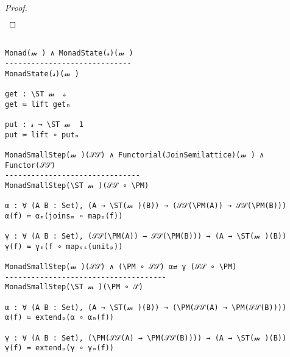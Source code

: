 \documentclass{article}
\begin{document}
\begin{lemma}
\begin{proof}
\begin{align*}
% 
% 
% 
% 
% 
% 
%                              
% 
% 
% 
% 
% 
% 
\end{align*}
\end{proof}
\end{lemma}

\begin{verbatim}

Monad(𝓂 ) ∧ MonadState(𝓈)(𝓂 )
-----------------------------
MonadState(𝓈)(𝓂 )

get : \ST 𝓂  𝓈
get ≔ lift getₘ

put : 𝓈 → \ST 𝓂  1
put ≔ lift ∘ putₘ

MonadSmallStep(𝓂 )(𝒮𝒮) ∧ Functorial(JoinSemilattice)(𝓂 ) ∧ Functor(𝒮𝒮)
-------------------------------
MonadSmallStep(\ST 𝓂 )(𝒮𝒮 ∘ \PM)

α : ∀ (A B : Set), (A → \ST(𝓂 )(B)) → (𝒮𝒮(\PM(A)) → 𝒮𝒮(\PM(B)))
α(f) ≔ αₘ(joinsₘ ∘ mapₚ(f))

γ : ∀ (A B : Set), (𝒮𝒮(\PM(A)) → 𝒮𝒮(\PM(B))) → (A → \ST(𝓂 )(B))
γ(f) ≔ γₘ(f ∘ mapₛₛ(unitₚ))

MonadSmallStep(𝓂 )(𝒮𝒮) ∧ (\PM ∘ 𝒮𝒮) α⇄ γ (𝒮𝒮 ∘ \PM)
-------------------------------------
MonadSmallStep(\ST 𝓂 )(\PM ∘ 𝒮)

α : ∀ (A B : Set), (A → \ST(𝓂 )(B)) → (\PM(𝒮𝒮(A) → \PM(𝒮𝒮(B))))
α(f) ≔ extendₚ(α ∘ αₘ(f))

γ : ∀ (A B : Set), (\PM(𝒮𝒮(A) → \PM(𝒮𝒮(B)))) → (A → \ST(𝓂 )(B))
γ(f) ≔ extendₚ(γ ∘ γₘ(f))
\end{verbatim}
\end{document}
